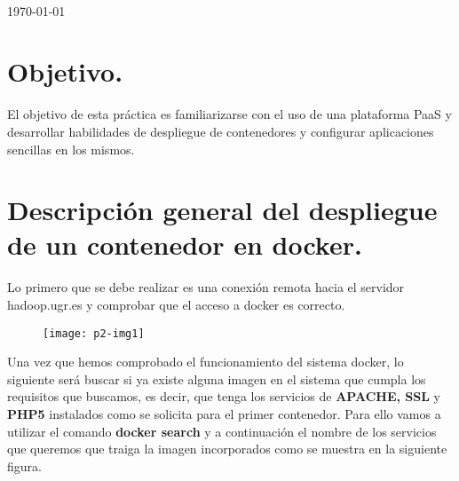 \documentclass[10pt]{article}
\begin{document}
\begin{center}
 		\\																		%
\vspace{2cm} 																				
\begin{center}																					
{\large \today}																	%
 			\end{center}												  						
\end{center}							 											
																					
\newpage																		

\tableofcontents 

\newpage

\section{Objetivo.}



El objetivo de esta práctica es familiarizarse con el uso de una plataforma PaaS y desarrollar habilidades de despliegue de contenedores y configurar aplicaciones sencillas en los mismos.\\



\section{Descripción general del despliegue de un contenedor en docker.} 

Lo primero que se debe realizar es una conexión remota hacia el servidor hadoop.ugr.es y comprobar que el acceso a docker es correcto.\\

\begin{figure}[H]
	\begin{center}
 		\texttt{[image: p2-img1]}
	\end{center} 
\end{figure}

Una vez que hemos comprobado el funcionamiento del sistema docker, lo siguiente será buscar si ya existe alguna imagen en el sistema que cumpla los requisitos que buscamos, es decir, que tenga los servicios de \textbf{APACHE, SSL} y \textbf{PHP5} instalados como se solicita para el primer contenedor. Para ello vamos a utilizar el comando \textbf{docker search} y a continuación el nombre de los servicios que queremos que traiga la imagen incorporados como se muestra en la siguiente figura.\\
\end{document}
